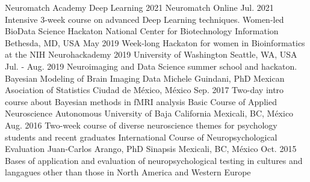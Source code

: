 \begin{cvcourses}
    \cvcourse
        {Neuromatch Academy Deep Learning 2021}
        {}
        {Neuromatch}
        {Online}
        {Jul. 2021}
        {Intensive 3-week course on advanced Deep Learning techniques.}
    \cvcourse
        {Women-led BioData Science Hackaton}
        {}
        {National Center for Biotechnology Information}
        {Bethesda, MD, USA}
        {May 2019}
        {Week-long Hackaton for women in Bioinformatics at the NIH}
    \cvcourse
        {Neurohackademy 2019}
        {}
        {University of Washington}
        {Seattle, WA, USA}
        {Jul. - Aug. 2019}
        {Neuroimaging and Data Science summer school and hackaton.}
    \cvcourse
        {Bayesian Modeling of Brain Imaging Data}
        {Michele Guindani, PhD}
        {Mexican Asociation of Statistics}
        {Ciudad de México, México}
        {Sep. 2017}
        {Two-day intro course about Bayesian methods in fMRI analysis}
     \cvcourse
         {Basic Course of Applied Neuroscience}
         {}
         {Autonomous University of Baja California}
         {Mexicali, BC, México}
         {Aug. 2016}
         {Two-week course of diverse neuroscience themes
         for psychology students and recent graduates}
    \cvcourse
        {International Course of Neuropsychological Evaluation}
        {Juan-Carlos Arango, PhD}
        {Sinapsis}
        {Mexicali, BC, México}
        {Oct. 2015}
        {Bases of application and evaluation of
            neuropsychological testing in cultures and langagues other
            than those in North America and Western Europe}
\end{cvcourses}

